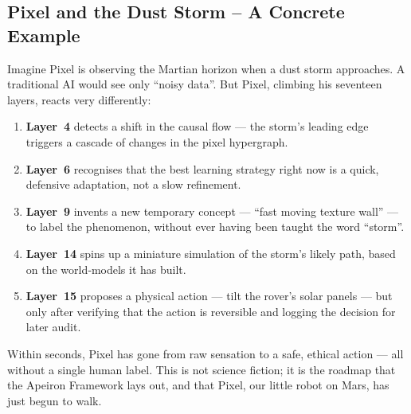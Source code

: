 \subsection*{Pixel and the Dust Storm – A Concrete Example}

Imagine Pixel is observing the Martian horizon when a dust storm
approaches.  A traditional AI would see only “noisy data”.  But Pixel,
climbing his seventeen layers, reacts very differently:

\begin{enumerate}
    \item \textbf{Layer~4} detects a shift in the causal flow — the
    storm's leading edge triggers a cascade of changes in the pixel
    hypergraph.
    \item \textbf{Layer~6} recognises that the best learning strategy
    right now is a quick, defensive adaptation, not a slow refinement.
    \item \textbf{Layer~9} invents a new temporary concept — “fast
    moving texture wall” — to label the phenomenon, without ever having
    been taught the word “storm”.
    \item \textbf{Layer~14} spins up a miniature simulation of the
    storm's likely path, based on the world‑models it has built.
    \item \textbf{Layer~15} proposes a physical action — tilt the
    rover's solar panels — but only after verifying that the action
    is reversible and logging the decision for later audit.
\end{enumerate}

Within seconds, Pixel has gone from raw sensation to a safe, ethical
action — all without a single human label.  This is not science fiction;
it is the roadmap that the Apeiron Framework lays out, and that Pixel,
our little robot on Mars, has just begun to walk.